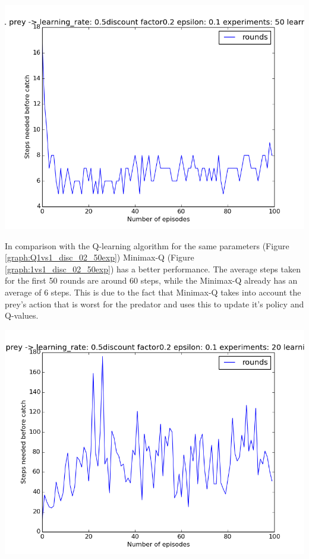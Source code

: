 \begin{center}
	\includegraphics[scale=0.3]{minimax_gridsize5_100round_50exp_disc02_learningrate_05}
	\label{graph:1vs1_disc_02_50exp}
\end{center}

In comparison with the Q-learning algorithm for the same parameters (Figure \ref{graph:Q1vs1_disc_02_50exp}) Minimax-Q (Figure  \ref{graph:1vs1_disc_02_50exp}) has a better performance. The average steps taken for the first 50 rounds are around 60 steps, while the Minimax-Q already has an average of 6 steps. This is due to the fact that Minimax-Q takes into account the prey's action that is worst for the predator and uses this to update it's policy and Q-values.

\begin{center}
	\includegraphics[scale=0.3]{qlearning_100rounds_20exp_disc02_alpha05}
	\label{graph:Q1vs1_disc_02_50exp}
\end{center}
